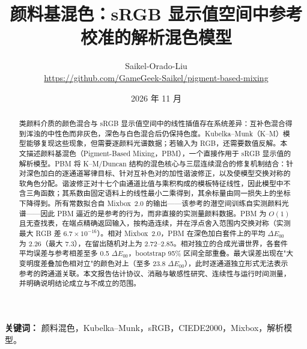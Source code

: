\documentclass[UTF8,11pt,a4paper,fontset=fandol]{ctexart}
\title{\bfseries 颜料基混色：sRGB 显示值空间中参考校准的解析混色模型}
\author{Saikel-Orado-Liu\\[2pt]
\small \url{https://github.com/GameGeek-Saikel/pigment-based-mixing}}
\date{2026 年 11 月}
\begin{document}
\maketitle

\begin{abstract}
\noindent
类颜料介质的颜色混合与 sRGB 显示值空间中的线性插值存在系统差异：互补色混合得到浑浊的中性色而非灰色，深色与白色混合后仍保持色度。Kubelka--Munk（K--M）模型能够复现这些现象，但需要逐颜料光谱数据；若输入为 RGB，还需要数值反解。本文描述颜料基混色（Pigment-Based Mixing，PBM），一个直接作用于 sRGB 显示值的解析模型。PBM 将 K--M/Duncan 结构的混色核心与三层连续混合的修复机制结合：针对深色加白的逐通道幂律目标、针对互补色对的加性谐波修正，以及使模型交换对称的软角色分配。谐波修正对十七个由通道比值与乘积构成的模板特征线性，因此模型中不含三角函数；其系数由固定语料上的线性最小二乘得到，其余标量由同一损失上的坐标下降得到。所有常数拟合自 Mixbox~2.0 的输出——该参考的潜空间训练自实测颜料光谱——因此 PBM 逼近的是参考的行为，而非直接的实测量颜料数据。PBM 为 $O(1)$ 且无查找表，在端点精确返回输入，按构造连续，并在浮点舍入范围内交换对称（实测最大 RGB 差 $6.7\times10^{-16}$）。相对 Mixbox~2.0，PBM 在深色加白套件上的平均 $\Delta E_{00}$ 为 2.26（最大 7.3），在留出随机对上为 2.72--2.85。相对独立的合成光谱世界，各套件平均误差与参考相差至多 0.5 $\Delta E_{00}$，bootstrap 95\% 区间全部重叠。最大误差出现在"大变明度差叠加色相对立"的颜色对上（至多 23.8 $\Delta E_{00}$），此时逐通道独立形式无法表示参考的跨通道关联。本文报告估计协议、消融与敏感性研究、连续性与运行时间测量，并明确说明结论成立与不成立的范围。
\end{abstract}

\noindent\textbf{关键词：} 颜料混色，Kubelka--Munk，sRGB，CIEDE2000，Mixbox，解析模型。








\end{document}
